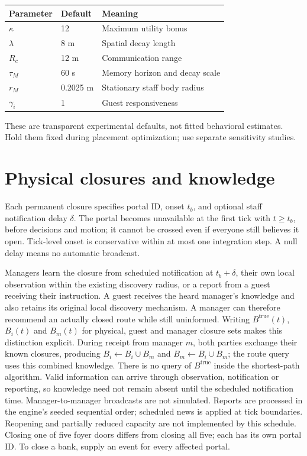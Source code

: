\documentclass[11pt]{article}
\begin{document}
\begin{center}
\begin{tabular}{lll}
\toprule
Parameter & Default & Meaning\\
\midrule
$\kappa$ & 12 & Maximum utility bonus\\
$\lambda$ & 8 m & Spatial decay length\\
$R_c$ & 12 m & Communication range\\
$\tau_M$ & 60 s & Memory horizon and decay scale\\
$r_M$ & 0.2025 m & Stationary staff body radius\\
$\gamma_i$ & 1 & Guest responsiveness\\
\bottomrule
\end{tabular}
\end{center}
These are transparent experimental defaults, not fitted behavioral estimates.
Hold them fixed during placement optimization; use separate sensitivity studies.

\section{Physical closures and knowledge}
Each permanent closure specifies portal ID, onset $t_b$, and optional staff
notification delay $\delta$. The portal becomes unavailable at the first tick
with $t\geq t_b$, before decisions and motion; it cannot be crossed even if
everyone still believes it open. Tick-level onset is conservative within at
most one integration step. A null delay means no automatic broadcast.

Managers learn the closure from scheduled notification at $t_b+\delta$,
their own local observation within the existing discovery radius, or a report
from a guest receiving their instruction. A guest receives the heard manager's
knowledge and also retains its original local discovery mechanism. A manager
can therefore recommend an actually closed route while still uninformed.
Writing $B^{\mathrm{true}}(t)$, $B_i(t)$ and $B_m(t)$ for physical, guest and
manager closure sets makes this distinction explicit. During receipt from
manager $m$, both parties exchange their known closures, producing
$B_i\leftarrow B_i\cup B_m$ and $B_m\leftarrow B_i\cup B_m$; the route query
uses this combined knowledge. There is no query of $B^{\mathrm{true}}$ inside
the shortest-path algorithm. Valid information can arrive through observation,
notification or reporting, so knowledge need not remain absent until the
scheduled notification time.
Manager-to-manager broadcasts are not simulated. Reports are processed in the
engine's seeded sequential order; scheduled news is applied at tick boundaries.
Reopening and partially reduced capacity are not implemented by this schedule.
Closing one of five foyer doors differs from closing all five; each has its own
portal ID. To close a bank, supply an event for every affected portal.
\end{document}
